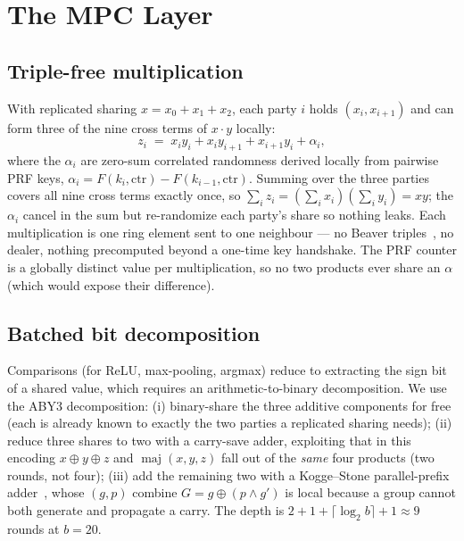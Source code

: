 \documentclass[11pt]{article}
\theoremstyle{plain}
\theoremstyle{definition}
\theoremstyle{remark}
\DeclareMathOperator{\maj}{maj}
\begin{document}
\section{The MPC Layer}\label{sec:mpc}

\subsection{Triple-free multiplication}

With replicated sharing $x=x_0+x_1+x_2$, each party $i$ holds $(x_i,
x_{i+1})$ and can form three of the nine cross terms of $x\cdot y$ locally:
\begin{equation}\label{eq:reshare}
z_i \;=\; x_i y_i + x_i y_{i+1} + x_{i+1} y_i + \alpha_i,
\end{equation}
where the $\alpha_i$ are zero-sum correlated randomness derived locally from
pairwise PRF keys, $\alpha_i = F(k_i, \mathrm{ctr}) - F(k_{i-1},
\mathrm{ctr})$. Summing over the three parties covers all nine cross terms
exactly once, so $\sum_i z_i = (\sum_i x_i)(\sum_i y_i) = xy$; the $\alpha_i$
cancel in the sum but re-randomize each party's share so nothing leaks. Each
multiplication is one ring element sent to one neighbour --- no Beaver
triples~\cite{Beaver}, no dealer, nothing precomputed beyond a one-time key
handshake. The PRF counter is a globally distinct value per multiplication,
so no two products ever share an $\alpha$ (which would expose their
difference).

\subsection{Batched bit decomposition}

Comparisons (for ReLU, max-pooling, argmax) reduce to extracting the sign
bit of a shared value, which requires an arithmetic-to-binary decomposition.
We use the ABY3 decomposition: (i) binary-share the three additive
components for free (each is already known to exactly the two parties a
replicated sharing needs); (ii) reduce three shares to two with a carry-save
adder, exploiting that in this encoding $x\oplus y\oplus z$ and
$\maj(x,y,z)$ fall out of the \emph{same} four products (two rounds, not
four); (iii) add the remaining two with a Kogge--Stone parallel-prefix
adder~\cite{KoggeStone}, whose $(g,p)$ combine
$G = g \oplus (p \wedge g')$ is local because a group cannot both generate
and propagate a carry. The depth is $2 + 1 + \lceil\log_2 b\rceil + 1
\approx 9$ rounds at $b=20$.
\end{document}
